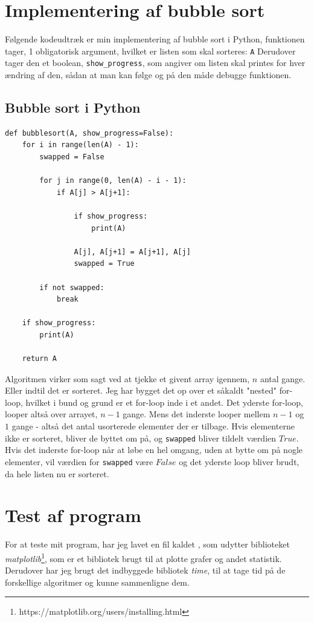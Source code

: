 \documentclass[12pt]{article}
\begin{document}
    \section{Implementering af bubble sort}
    Følgende kodeudtræk er min implementering af bubble sort i Python, funktionen tager, 1 obligatorisk argument, hvilket er listen som skal sorteres: \texttt{A}
    Derudover tager den et boolean, \texttt{show\_progress}, som angiver om listen skal printes for hver ændring af den, sådan at man kan følge og på den måde debugge funktionen.

        \subsection{Bubble sort i Python}
        \begin{verbatim}
def bubblesort(A, show_progress=False):
    for i in range(len(A) - 1):
        swapped = False

        for j in range(0, len(A) - i - 1):
            if A[j] > A[j+1]:

                if show_progress:
                    print(A)

                A[j], A[j+1] = A[j+1], A[j]
                swapped = True

        if not swapped:
            break

    if show_progress:
        print(A)

    return A
        \end{verbatim}
        \label{snip:bubblesort}
        Algoritmen virker som sagt ved at tjekke et givent array  igennem, $n$ antal gange. Eller indtil det er sorteret.
        Jeg har bygget det op over et såkaldt "nested" for-loop, hvilket i bund og grund er et for-loop inde i et andet.
        Det yderste for-loop, looper altså over arrayet, $n-1$ gange.
        Mens det inderste looper mellem $n-1$ og $1$ gange - altså det antal usorterede elementer der er tilbage.
        Hvis elementerne ikke er sorteret, bliver de byttet om på, og \texttt{swapped} bliver tildelt værdien $True$.
        Hvis det inderste for-loop når at løbe en hel omgang, uden at bytte om på nogle elementer, vil værdien for \texttt{swapped} være $False$ og det yderste loop bliver brudt, da hele listen nu er sorteret.




    \section{Test af program}
    For at teste mit program, har jeg lavet en fil kaldet , som udytter biblioteket \emph{matplotlib}\footnote{https://matplotlib.org/users/installing.html}, som er et bibliotek brugt til at plotte grafer og andet statistik.
    Derudover har jeg brugt det indbyggede bibliotek \emph{time}, til at tage tid på de forskellige algoritmer og kunne sammenligne dem.
\end{document}
